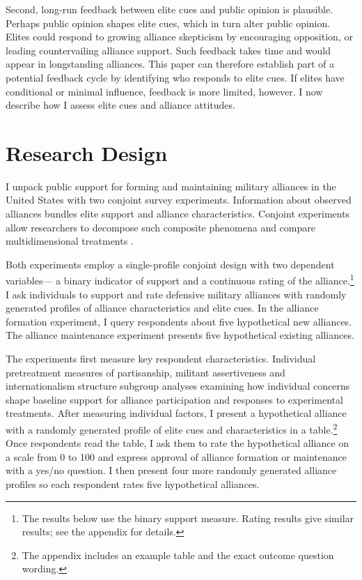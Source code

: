 \documentclass[12pt]{article}
\begin{document}
Second, long-run feedback between elite cues and public opinion is plausible. 
Perhaps public opinion shapes elite cues, which in turn alter public opinion. 
Elites could respond to growing alliance skepticism by encouraging opposition, or leading countervailing alliance support.
Such feedback takes time and would appear in longstanding alliances.
This paper can therefore establish part of a potential feedback cycle by identifying who responds to elite cues.  
If elites have conditional or minimal influence, feedback is more limited, however.
I now describe how I assess elite cues and alliance attitudes. 



\section{Research Design}



I unpack public support for forming and maintaining military alliances in the United States with two conjoint survey experiments. 
Information about observed alliances bundles elite support and alliance characteristics. 
Conjoint experiments allow researchers to decompose such composite phenomena and compare multidimensional treatments \citep{Hainmuelleretal2014}. 


Both experiments employ a single-profile conjoint design with two dependent variables--- a binary indicator of support and a continuous rating of the alliance.\footnote{The results below use the binary support measure. Rating results give similar results; see the appendix for details.} 
I ask individuals to support and rate defensive military alliances with randomly generated profiles of alliance characteristics and elite cues. 
In the alliance formation experiment, I query respondents about five hypothetical new alliances. 
The alliance maintenance experiment presents five hypothetical existing alliances.


The experiments first measure key respondent characteristics.  
Individual pretreatment measures of partisanship, militant assertiveness and internationalism structure subgroup analyses examining how individual concerns shape baseline support for alliance participation and responses to experimental treatments. 
After measuring individual factors, I present a hypothetical alliance with a randomly generated profile of elite cues and characteristics in a table.\footnote{The appendix includes an example table and the exact outcome question wording.} 
Once respondents read the table, I ask them to rate the hypothetical alliance on a scale from 0 to 100 and express approval of alliance formation or maintenance with a yes/no question. 
I then present four more randomly generated alliance profiles so each respondent rates five hypothetical alliances.
\end{document}
